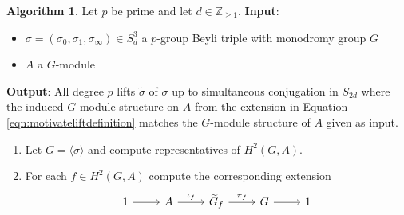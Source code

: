 \documentclass{dcthesis}
\newcommand{\ZZ}{\mathbb Z}
\newcommand{\wt}[1]{\widetilde{#1}}
\numberwithin{equation}{section}
\theoremstyle{definition}
\newtheorem{alg}[equation]{Algorithm}
\theoremstyle{remark}
\newtheorem{remark}[equation]{Remark}
\begin{document}
{{      %
    \begin{alg}\label{alg:triples}
      Let $p$ be prime and
      let $d\in\ZZ_{\geq 1}$.
      \newline
      \textbf{Input}:
      \begin{itemize}
        \item 
          $\sigma=(\sigma_0,\sigma_1,\sigma_\infty)\in S_d^3$ a $p$-group Beyli triple
          with monodromy group $G$
        \item
          $A$ a $G$-module
      \end{itemize}
      \textbf{Output}:
      \newline
      All degree $p$ lifts $\wt{\sigma}$
      of $\sigma$ up to
      simultaneous conjugation in $S_{2d}$
      where the induced $G$-module structure on
      $A$ from
      the extension in Equation
      \ref{eqn:motivateliftdefinition}
      matches the $G$-module structure of $A$
      given as input.
      \begin{enumerate}
        \item
          \label{alg:triplescomputeH2reps}
          Let $G = \langle\sigma\rangle$
          and compute representatives
          of $H^2(G,A)$.
        \item
          \label{alg:triplescomputeextensions}
          For each $f\in H^2(G,A)$
          compute the corresponding
          extension
          \begin{equation}
            \label{eqn:extensiondependson2cocycle}
            \begin{tikzcd}
              1\arrow{r}&A\arrow{r}{\iota_f}
                        &\wt{G}_f\arrow{r}{\pi_f}
                        &G\arrow{r}&1
            \end{tikzcd}
          \end{equation}

\end{enumerate}
\end{alg}}}
\end{document}
